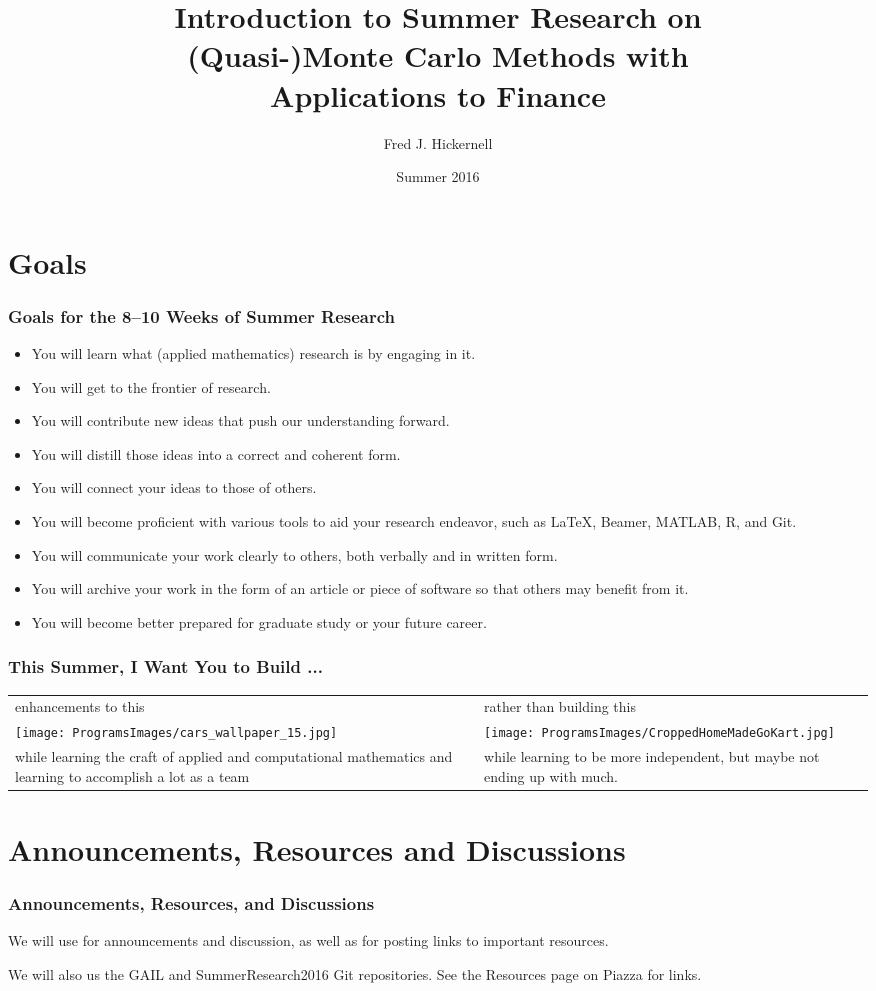 \documentclass[10pt,compress,xcolor={usenames,dvipsnames},CJK]{beamer}
\title[(Quasi-)Monte Carlo \& Finance]{Introduction to Summer Research on \\
	(Quasi-)Monte Carlo Methods with \\[0.5ex] Applications to Finance}
\author{Fred J. Hickernell}
\institute{Department of Applied Mathematics,  Illinois Institute of Technology \\
\href{mailto:hickernell@iit.edu}{\nolinkurl{hickernell@iit.edu}} \quad
\href{http://mypages.iit.edu/~hickernell}{\nolinkurl{mypages.iit.edu/~hickernell}}}
\date{Summer 2016}
\begin{document}
\frame{\titlepage}

\section{Goals}
\begin{frame}\frametitle{Goals for the 8--10 Weeks of Summer Research}
\begin{itemize}
\item You will learn what (applied mathematics) research is by engaging in it.
\item You will get to the frontier of research.
\item You will contribute new ideas that push our understanding forward.
\item You will distill those ideas into a correct and coherent form.
\item You will connect your ideas to those of others.
\item You will become proficient with various tools to aid your research endeavor, such as \LaTeX, Beamer, MATLAB, R, and Git.
\item You will communicate your work clearly to others, both verbally and in written form.
\item You will archive your work in the form of an article or piece of software so that others may benefit from it.
\item You will become better prepared for graduate study or your future career.
\end{itemize}
\end{frame}

\begin{frame}
\frametitle{This Summer, I Want You to Build ...}
\begin{tabular}{>{\centering}m{5.5cm}>{\centering}m{5.5cm}}
enhancements to this &
rather than building this \tabularnewline
\texttt{[image: ProgramsImages/cars\_wallpaper\_15.jpg]} &
\texttt{[image: ProgramsImages/CroppedHomeMadeGoKart.jpg]} \tabularnewline
while learning the craft of applied and computational mathematics and learning to accomplish a lot as a team & while learning to be more independent, but maybe not ending up with much.
\end{tabular}
\end{frame}




\section{Announcements, Resources and Discussions}
\begin{frame}
\frametitle{Announcements, Resources, and Discussions}

We will use   for announcements and discussion, as well as for posting links to important resources.

We will also us the GAIL and SummerResearch2016 Git repositories.  See the Resources page on Piazza for links.

\end{frame}
\end{document}
